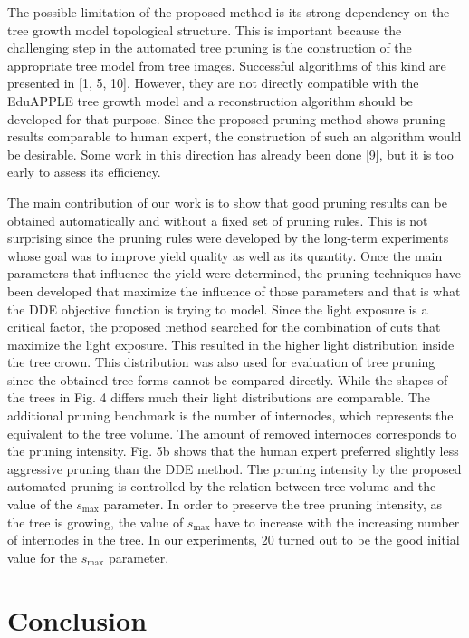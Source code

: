 \documentclass[1p]{elsarticle}
\begin{document}
The possible limitation of the proposed method is its strong dependency
on the tree growth model topological structure. This is important
because the challenging step in the automated tree pruning is the
construction of the appropriate tree model from tree images. Successful
algorithms of this kind are presented in {[}1, 5, 10{]}. However, they
are not directly compatible with the EduAPPLE tree growth model and a
reconstruction algorithm should be developed for that purpose. Since the
proposed pruning method shows pruning results comparable to human
expert, the construction of such an algorithm would be desirable. Some
work in this direction has already been done {[}9{]}, but it is too
early to assess its efficiency.

The main contribution of our work is to show that good pruning results
can be obtained automatically and without a fixed set of pruning rules.
This is not surprising since the pruning rules were developed by the
long-term experiments whose goal was to improve yield quality as well as
its quantity. Once the main parameters that influence the yield were
determined, the pruning techniques have been developed that maximize the
influence of those parameters and that is what the DDE objective
function is trying to model. Since the light exposure is a critical
factor, the proposed method searched for the combination of cuts that
maximize the light exposure. This resulted in the higher light
distribution inside the tree crown. This distribution was also used for
evaluation of tree pruning since the obtained tree forms cannot be
compared directly. While the shapes of the trees in Fig. 4 differs much
their light distributions are comparable. The additional pruning
benchmark is the number of internodes, which represents the equivalent
to the tree volume. The amount of removed internodes corresponds to the
pruning intensity. Fig. 5b shows that the human expert preferred
slightly less aggressive pruning than the DDE method. The pruning
intensity by the proposed automated pruning is controlled by the
relation between tree volume and the value of the \(s_{\mathrm{\max}}\)
parameter. In order to preserve the tree pruning intensity, as the tree
is growing, the value of \(s_{\mathrm{\max}}\) have to increase with the
increasing number of internodes in the tree. In our experiments, 20
turned out to be the good initial value for the \(s_{\mathrm{\max}}\)
parameter.

\section{Conclusion}
\end{document}
